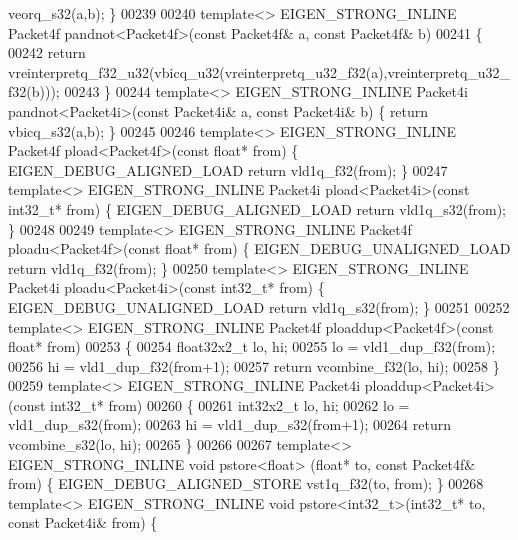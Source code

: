 \begin{DoxyCode}
{{      veorq\_s32(a,b); \}
00239 
00240 \textcolor{keyword}{template}<> EIGEN\_STRONG\_INLINE Packet4f pandnot<Packet4f>(\textcolor{keyword}{const} Packet4f& a, \textcolor{keyword}{const} Packet4f& b)
00241 \{
00242   \textcolor{keywordflow}{return} vreinterpretq\_f32\_u32(vbicq\_u32(vreinterpretq\_u32\_f32(a),vreinterpretq\_u32\_f32(b)));
00243 \}
00244 \textcolor{keyword}{template}<> EIGEN\_STRONG\_INLINE Packet4i pandnot<Packet4i>(\textcolor{keyword}{const} Packet4i& a, \textcolor{keyword}{const} Packet4i& b) \{ \textcolor{keywordflow}{return} 
      vbicq\_s32(a,b); \}
00245 
00246 \textcolor{keyword}{template}<> EIGEN\_STRONG\_INLINE Packet4f pload<Packet4f>(\textcolor{keyword}{const} \textcolor{keywordtype}{float}*    from) \{ EIGEN\_DEBUG\_ALIGNED\_LOAD \textcolor{keywordflow}{
      return} vld1q\_f32(from); \}
00247 \textcolor{keyword}{template}<> EIGEN\_STRONG\_INLINE Packet4i pload<Packet4i>(\textcolor{keyword}{const} int32\_t*  from) \{ EIGEN\_DEBUG\_ALIGNED\_LOAD \textcolor{keywordflow}{
      return} vld1q\_s32(from); \}
00248 
00249 \textcolor{keyword}{template}<> EIGEN\_STRONG\_INLINE Packet4f ploadu<Packet4f>(\textcolor{keyword}{const} \textcolor{keywordtype}{float}*   from) \{ EIGEN\_DEBUG\_UNALIGNED\_LOAD \textcolor{keywordflow}{
      return} vld1q\_f32(from); \}
00250 \textcolor{keyword}{template}<> EIGEN\_STRONG\_INLINE Packet4i ploadu<Packet4i>(\textcolor{keyword}{const} int32\_t* from) \{ EIGEN\_DEBUG\_UNALIGNED\_LOAD \textcolor{keywordflow}{
      return} vld1q\_s32(from); \}
00251 
00252 \textcolor{keyword}{template}<> EIGEN\_STRONG\_INLINE Packet4f ploaddup<Packet4f>(\textcolor{keyword}{const} \textcolor{keywordtype}{float}* from)
00253 \{
00254   float32x2\_t lo, hi;
00255   lo = vld1\_dup\_f32(from);
00256   hi = vld1\_dup\_f32(from+1);
00257   \textcolor{keywordflow}{return} vcombine\_f32(lo, hi);
00258 \}
00259 \textcolor{keyword}{template}<> EIGEN\_STRONG\_INLINE Packet4i ploaddup<Packet4i>(\textcolor{keyword}{const} int32\_t* from)
00260 \{
00261   int32x2\_t lo, hi;
00262   lo = vld1\_dup\_s32(from);
00263   hi = vld1\_dup\_s32(from+1);
00264   \textcolor{keywordflow}{return} vcombine\_s32(lo, hi);
00265 \}
00266 
00267 \textcolor{keyword}{template}<> EIGEN\_STRONG\_INLINE \textcolor{keywordtype}{void} pstore<float>  (\textcolor{keywordtype}{float}*    to, \textcolor{keyword}{const} Packet4f& from) \{ 
      EIGEN\_DEBUG\_ALIGNED\_STORE vst1q\_f32(to, from); \}
00268 \textcolor{keyword}{template}<> EIGEN\_STRONG\_INLINE \textcolor{keywordtype}{void} pstore<int32\_t>(int32\_t*  to, \textcolor{keyword}{const} Packet4i& from) \{ 
}}
\end{DoxyCode}
